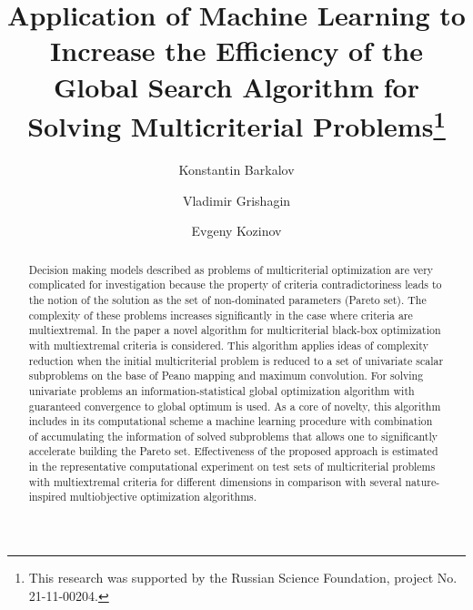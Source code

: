 \documentclass[runningheads]{llncs}
\begin{document}
%
\title{Application of Machine Learning to Increase the Efficiency of the Global Search Algorithm for Solving Multicriterial Problems\thanks{This research was supported by the Russian Science Foundation, project No. 21-11-00204.}}
%
%
\author{Konstantin Barkalov \and
Vladimir Grishagin \and
Evgeny Kozinov}
%
%

%
\maketitle              %
%
	\begin{abstract}
Decision making models described as problems of multicriterial optimization are very complicated for investigation because the property of criteria contradictoriness leads to the notion of the solution as the set of non-dominated parameters (Pareto set). The complexity of these problems increases significantly in the case where criteria are multiextremal.
In the paper a novel algorithm for multicriterial black-box optimization with multiextremal criteria is considered. This algorithm applies ideas of complexity reduction when the initial multicriterial problem is reduced to a set of univariate scalar subproblems on the base of Peano mapping and maximum convolution. For solving univariate problems an information-statistical global optimization algorithm with guaranteed convergence to global optimum is used. As a core of novelty, this algorithm includes in its computational scheme a machine learning procedure with combination of accumulating the information of solved subproblems that allows one to significantly accelerate building the Pareto set.
Effectiveness of the proposed approach is estimated in the representative computational experiment on test sets of multicriterial problems with multiextremal criteria for different dimensions in comparison with several nature-inspired multiobjective optimization algorithms.


\end{abstract}
%
%
%
\end{document}
